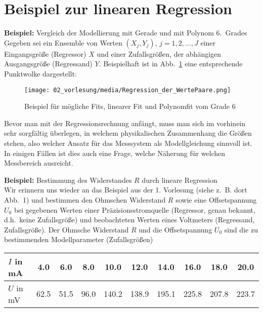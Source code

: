 \section{Beispiel zur linearen Regression}
\label{subsection:lineare-Regression}
\textbf{Beispiel:} Vergleich der Modellierung mit Gerade und mit Polynom 6.~Grades \\
Gegeben sei ein Ensemble von Werten
$(X_j,Y_j )$, $j = 1,2,\ldots ,J$ einer Eingangsgröße (Regressor) $X$ und einer Zufallsgrößen,
der abhängigen Ausgangsgröße (Regressand) $Y$.
Beispielhaft ist in Abb.~\ref{fig:LineareRegressionMoeglFits} eine
entsprechende Punktwolke dargestellt:
\begin{figure}[!htbp]
	\centering
	\texttt{[image: 02\_vorlesung/media/Regression\_der\_WertePaare.png]}
    \caption{Beispiel für mögliche Fits, linearer Fit und Polynomfit vom Grade 6} \label{fig:LineareRegressionMoeglFits}
\end{figure}
Bevor man mit der Regressionsrechnung anfängt, muss man sich im vorhinein sehr sorgfältig
überlegen, in welchem physikalischen Zusammenhang die Größen stehen, also welcher
Ansatz für das Messsystem als Modellgleichung sinnvoll ist.
In einigen Fällen ist dies auch eine Frage, welche Näherung für welchen Messbereich
ausreicht.

\textbf{Beispiel:} Bestimmung des Widerstandes $R$ durch lineare Regression \\
Wir erinnern uns wieder an das Beispiel aus der 1. Vorlesung (siehe z.~B. dort Abb.~1) und bestimmen den Ohmschen Widerstand $R$ sowie eine Offsetspannung $U_0$ bei gegebenen Werten einer
Präzisions\-strom\-quelle (Regressor, genau bekannt, d.h.\ keine Zufallsgröße) und beobachteten
Werten eines Voltmeters (Regressand, Zufallsgröße).
Der Ohmsche Widerstand $R$ und die Offsetspannung $U_0$ sind die zu bestimmenden Modellparameter (Zufallsgrößen)

\begin{center}
	\begin{tabular}{l||c|c|c|c|c|c|c|c|c}
			\hline\hline
			$I$ in mA &    4.0 &     6.0 &     8.0 &    10.0 &    12.0 &    14.0 &    16.0 &    18.0 &    20.0\\
			\hline
			$U$ in mV &    62.5 &    51.5 &    96.0 &   140.2 &   138.9 &   195.1 &   225.8 &   207.8 &   223.7 \\
			\hline\hline
	\end{tabular}
\end{center}

